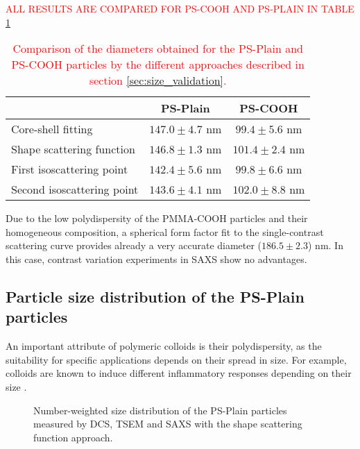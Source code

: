 \textcolor{red}{ALL RESULTS ARE COMPARED FOR PS-COOH AND PS-PLAIN IN TABLE \ref{tab:comparison_results_polymers}}

\begin{table}
\caption[Comparison of the diameters obtained by different evaluation approaches.]{\textcolor{red}{Comparison of the diameters obtained for the PS-Plain and PS-COOH particles by the different approaches described in section \ref{sec:size_validation}.}}
\begin{tabular}{l|cc}

& PS-Plain    &  PS-COOH\\
\hline
Core-shell fitting &  $147.0 \pm 4.7$ nm   &     $99.4 \pm 5.6$ nm     \\
Shape scattering function &  $146.8 \pm 1.3$ nm   &   $101.4 \pm 2.4$ nm \\
First isoscattering point &  $142.4 \pm 5.6$ nm    &     $99.8 \pm 6.6$ nm \\
Second isoscattering point &  $143.6 \pm 4.1$ nm  &   $102.0 \pm 8.8$ nm    \\ \hline

\end{tabular}
\label{tab:comparison_results_polymers}
\end{table}

Due to the low polydispersity of the PMMA-COOH particles and their homogeneous composition, a spherical form factor fit to the single-contrast scattering curve provides already a very accurate diameter ($186.5\pm2.3$) nm. In this case, contrast variation experiments in SAXS show no advantages.

\subsection{Particle size distribution of the PS-Plain particles}

An important attribute of polymeric colloids is their polydispersity, as the suitability for specific applications depends on their spread in size. For example, colloids are known to induce different inflammatory responses depending on their size \citep{kusaka_effect_2014}.

\begin{figure}
	\begin{center}
		
	\end{center}
	\caption[Number-weighted size distribution of the PS-Plain particles.]{Number-weighted size distribution of the PS-Plain particles measured by DCS, TSEM \citep{nicolet_inter-laboratory_2016} and SAXS with the shape scattering function approach.}
	\label{fig:PSPlainSizeDistribution}
\end{figure}

